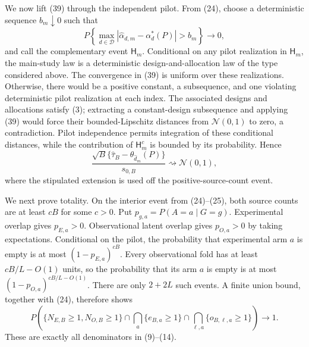 We now lift (39) through the independent pilot.  From (24), choose a deterministic sequence \(b_m\downarrow0\) such that
\[
 P\left\{\max_{d\in\mathcal D}
 |\widehat\alpha_{d,m}-\alpha_d^*(P)|>b_m\right\}
 \longrightarrow0,                                         \tag{40}
\]
and call the complementary event \(\mathsf H_m\).  Conditional on any pilot realization in \(\mathsf H_m\), the main-study law is a deterministic design-and-allocation law of the type considered above.  The convergence in (39) is uniform over these realizations.  Otherwise, there would be a positive constant, a subsequence, and one violating deterministic pilot realization at each index.  The associated designs and allocations satisfy (3); extracting a constant-design subsequence and applying (39) would force their bounded-Lipschitz distances from \(\mathcal N(0,1)\) to zero, a contradiction.  Pilot independence permits integration of these conditional distances, while the contribution of \(\mathsf H_m^c\) is bounded by its probability.  Hence
\[
 \frac{\sqrt B\{\widehat\tau_B-\theta_{\widehat d_m}(P)\}}{s_{0,B}}
 \rightsquigarrow\mathcal N(0,1),                           \tag{41}
\]
where the stipulated extension is used off the positive-source-count event.

We next prove totality.  On the interior event from (24)--(25), both source counts are at least \(cB\) for some \(c>0\).  Put \(p_{g,a}=P(A=a\mid G=g)\).  Experimental overlap gives \(p_{E,a}>0\).  Observational latent overlap gives \(p_{O,a}>0\) by taking expectations.  Conditional on the pilot, the probability that experimental arm \(a\) is empty is at most \((1-p_{E,a})^{cB}\).  Every observational fold has at least \(cB/L-O(1)\) units, so the probability that its arm \(a\) is empty is at most \((1-p_{O,a})^{cB/L-O(1)}\).  There are only \(2+2L\) such events.  A finite union bound, together with (24), therefore shows
\[
 P\left(
 \{N_{E,B}\ge1,N_{O,B}\ge1\}
 \cap\bigcap_a\{e_{B,a}\ge1\}
 \cap\bigcap_{\ell,a}\{o_{B,\ell,a}\ge1\}
 \right)\longrightarrow1.                                  \tag{42}
\]
These are exactly all denominators in (9)--(14).


